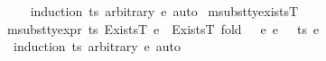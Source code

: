 \begin{isabellebody}
%
\isadelimproof
\ \ %
\endisadelimproof
%
\isatagproof
{}\isamarkupfalse%
\ {\isacharparenleft}{\kern0pt}induction\ ts\ arbitrary{\isacharcolon}{\kern0pt}\ e{\isacharsemicolon}{\kern0pt}\ auto{\isacharparenright}{\kern0pt}%
\endisatagproof
{\isafoldproof}%
%
\isadelimproof
\isanewline
%
\endisadelimproof
\isanewline
{}\isamarkupfalse%
\ msubst{\isacharunderscore}{\kern0pt}ty{\isacharunderscore}{\kern0pt}existsT{\isacharcolon}{\kern0pt}\isanewline
{\isachardoublequoteopen}msubst{\isacharunderscore}{\kern0pt}ty{\isacharunderscore}{\kern0pt}expr\ ts\ {\isacharparenleft}{\kern0pt}ExistsT\ e{\isacharparenright}{\kern0pt}\ {\isacharequal}{\kern0pt}\ ExistsT\ {\isacharparenleft}{\kern0pt}fold\ {\isacharparenleft}{\kern0pt}{\isasymlambda}\ {\isasymtau}\ e{\isacharprime}{\kern0pt}{\isachardot}{\kern0pt}\ {\isacharparenleft}{\kern0pt}e{\isacharprime}{\kern0pt}{\isacharbrackleft}{\kern0pt}{}\ {\isasymmapsto}\isactrlsub {\isasymtau}\ {\isasymtau}{\isacharbrackright}{\kern0pt}{\isacharparenright}{\kern0pt}{\isacharparenright}{\kern0pt}\ ts\ e{\isacharparenright}{\kern0pt}{\isachardoublequoteclose}\isanewline
%
\isadelimproof
\ \ %
\endisadelimproof
%
\isatagproof
{}\isamarkupfalse%
\ {\isacharparenleft}{\kern0pt}induction\ ts\ arbitrary{\isacharcolon}{\kern0pt}\ e{\isacharsemicolon}{\kern0pt}\ auto{\isacharparenright}{\kern0pt}%
\endisatagproof
{\isafoldproof}%
%
\isadelimproof
\isanewline
%
\endisadelimproof
%
\isadelimtheory
\isanewline
%
\endisadelimtheory
%
\isatagtheory
{}\isamarkupfalse%
%
\endisatagtheory
{\isafoldtheory}%
%
\isadelimtheory
%
\endisadelimtheory
%
\end{isabellebody}%
\endinput
